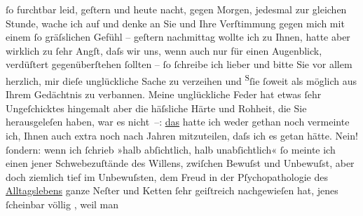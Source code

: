 \begin{ledgroupsized}[t]{13cm}
               ſo furchtbar leid, geſtern und heute nacht, gegen Morgen, jedesmal zur gleichen
               Stunde, wache ich auf und denke an Sie und Ihre Verſtimmung gegen mich mit einem ſo
                  {\pb}gräſslichen Gefühl – geſtern
               nachmittag wollte ich zu Ihnen, hatte aber wirklich zu ſehr Angſt, daſs wir uns, wenn
               auch nur für einen Augenblick, verdüſtert gegenüberſtehen ſollten – ſo ſchreibe ich
               lieber und bitte Sie vor allem herzlich, mir dieſe unglückliche Sache zu verzeihen
                  und{ }{\pb}\substVorne{}\textsuperscript{S}\substDazwischen{}ſ\substHinten{}ie ſoweit als möglich aus Ihrem Gedächtnis zu verbannen.\pend
           \pstart
           Meine unglückliche  Feder hat etwas ſehr
               Ungeſchicktes hingemalt aber die häſsliche Härte und Rohheit, die Sie herausgeleſen
               haben, war es nicht –: \uline{das} hatte ich weder gethan
               noch vermeinte ich, Ihnen auch extra noch nach {\pb}Jahren mitzuteilen, daſs ich es
               getan hätte. Nein! ſondern: wenn ich ſchrieb »halb abſichtlich, halb unabſichtlich«
               ſo meinte ich einen jener Schwebezuſtände des Willens, zwiſchen Bewuſst und
               Unbewuſst, aber doch ziemlich tief im Unbewuſsten, dem Freud in der Pſychopathologie
                  des \uline{Alltagslebens} ganze Neſter und {\pb}Ketten
               ſehr geiſtreich nachgewieſen hat, jenes ſcheinbar völlig \label{K_L01978_1v}\label{K_L01978_1h}, weil man

\end{ledgroupsized}
